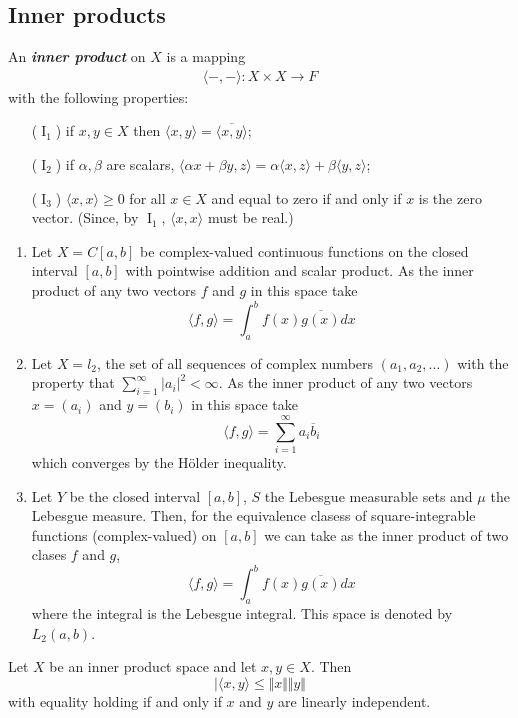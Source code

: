 \documentclass{article}
\theoremstyle{definition}
\numberwithin{equation}{section}
\begin{document}
	\subsection{Inner products}
	An \textbf{\textit{inner product}} on $X$ is a mapping
	\begin{align*}
		\langle-,-\rangle:X\times X\to F
	\end{align*}
	with the following properties:
	\begin{enumerate}
		\item[($\operatorname{I}_1$)] if $x,y\in X$ then $\langle x,y\rangle=\overline{\langle x,y\rangle}$;
		\item[($\operatorname{I}_2$)] if $\alpha,\beta$ are scalars, $\langle\alpha x+\beta y,z\rangle =\alpha\langle x,z\rangle+\beta\langle y,z\rangle$;
		\item[($\operatorname{I}_3$)] $\langle x,x\rangle\geq0$ for all $x\in X$ and equal to zero if and only if $x$ is the zero vector. (Since, by $\operatorname{I}_1$, $\langle x,x\rangle$ must be real.)
	\end{enumerate}
	\begin{examples}\leavevmode
		\begin{enumerate}
			\item Let $X=C[a,b]$ be complex-valued continuous functions on the closed interval $[a,b]$ with pointwise addition and scalar product. As the inner product of any two vectors $f$ and $g$ in this space take
		\[\langle f,g\rangle=\int_a^bf(x)\overline{g(x)}dx\]
		\item Let $X=l_2$, the set of all sequences of complex numbers $(a_1,a_2,\ldots)$ with the property that $\sum_{i=1}^\infty|a_i|^2<\infty$. As the inner product of any two vectors $x=(a_i)$ and $y=(b_i)$ in this space take
		\[\langle f,g\rangle=\sum_{i=1}^\infty a_i\overline{b}_i\]
		which converges by the Hölder inequality.
		
		\item Let $Y$ be the closed interval $[a,b]$, $S$ the Lebesgue measurable sets and $\mu$ the Lebesgue measure. Then, for the equivalence clasess of square-integrable functions (complex-valued) on $[a,b]$ we can take as the inner product of two clases $f$ and $g$,
				\[\langle f,g\rangle=\int_a^bf(x)\overline{g(x)}dx\]
		where the integral is the Lebesgue integral. This space is denoted by $L_2(a,b)$.
		\end{enumerate}
		\end{examples}
		\begin{thm}
			Let $X$ be an inner product space and let $x,y\in X$. Then
			\[|\langle x,y\rangle\leq\Vert x\Vert\Vert y\Vert\]
			with equality holding if and only if $x$ and $y$ are linearly independent.
		\end{thm}
\end{document}

